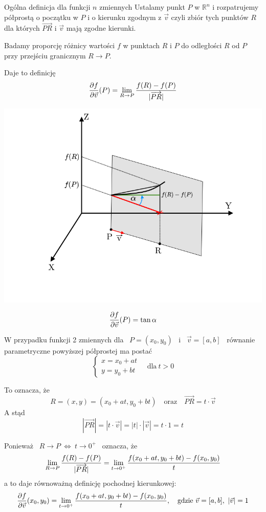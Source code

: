 \begin{tw}{Ogólna definicja dla funkcji $n$ zmiennych}
    Ustalamy punkt $P$ w $\mathbb{R}^n$ i rozpatrujemy półprostą o początku w $P$ i o kierunku zgodnym z $\vec{v}$ czyli zbiór tych punktów
    $R$ dla których $\overrightarrow{PR}$ i $\vec{v}$ mają zgodne kierunki.

    Badamy proporcję różnicy wartości $f$ w punktach $R$ i $P$ do odległości $R$ od $P$ przy przejściu granicznym $ R \to P $.

    Daje to definicję
    \[ \frac{\partial f}{\partial \vec{v}}(P) = \lim_{R \to P} \frac{f(R) - f(P)}{|\overrightarrow{PR}|} \]

    \begin{center}
        \includegraphics[scale=0.5]{img/pochodnakierunkowa.png}
    \end{center}
    \[ \frac{\partial f}{\partial \vec{v}}(P) = \tan \alpha \]
\end{tw}

W przypadku funkcji 2 zmiennych dla \ $ P = (x_0, y_0) $ \ i \ $ \vec{v} = [a,b] $ \ równanie parametryczne powyższej półprostej ma postać
\[ \begin{cases} 
    x = x_0 + at \\
    y = y_0 + bt
\end{cases} \quad \text{dla} \ t > 0 \]

To oznacza, że
\[ R = (x,y) = (x_0 + at, y_0 + bt) \quad \text{oraz} \quad \overrightarrow{PR} = t \cdot \vec{v} \]
A stąd
\[ |\overrightarrow{PR}| = |t \cdot \vec{v}| = |t| \cdot |\vec{v}| = t \cdot 1 = t \]

Ponieważ \ $ R \to P \ \Leftrightarrow \ t \to 0^+ $ \ oznacza, że
\[ \lim_{R \to P} \frac{f(R) - f(P)}{|\overrightarrow{PR}|} = \lim_{t \to 0^+} \frac{f(x_0 + at, y_0 + bt) - f(x_0, y_0)}{t} \]
a to daje równoważną definicję pochodnej kierunkowej:
\[ \frac{\partial f}{\partial \vec{v}} (x_0, y_0) = \lim_{t \to 0^+} \frac{f(x_0 + at, y_0 + bt) - f(x_0, y_0)}{t}, \quad \text{gdzie} \ \vec{v} = [a,b], \ |\vec{v}| = 1 \]

